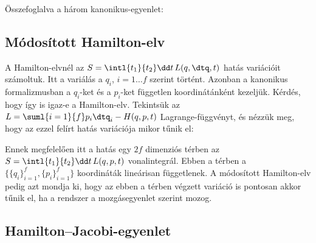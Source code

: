    Összefoglalva a három kanonikus-egyenlet:
   
   \subsection{Módosított Hamilton-elv}
   
   A Hamilton-elvnél az $S=\intl{t_1}{t_2}\dd t\,L(q,\dtq,t)$ hatás variációit számoltuk.
   Itt a variálás a $q_i$, $i=1\dots f$ szerint történt.
   Azonban a kanonikus formalizmusban a $q_i$-ket és a $p_i$-ket független koordinátánként kezeljük.
   Kérdés, hogy így is igaz-e a Hamilton-elv.
   Tekintsük az $L=\suml{i=1}{f}p_i\dtq_i-H(q,p,t)$ Lagrange-függvényt, és nézzük meg, hogy az ezzel felírt hatás variációja mikor tűnik el:
   
   Ennek megfelelően itt a hatás egy $2f$ dimenziós térben az $S=\intl{t_1}{t_2}\dd t\,L(q,p,t)$ vonalintegrál.
   Ebben a térben a $\big\{\{q_i\}_{i=1}^{f},\{p_i\}_{i=1}^{f}\big\}$ koordináták lineárisan függetlenek.
   A módosított Hamilton-elv pedig azt mondja ki, hogy az ebben a térben végzett variáció is pontosan akkor tűnik el, ha a rendszer a mozgásegyenlet szerint mozog.
   
  \subsection{Hamilton--Jacobi-egyenlet}
   
